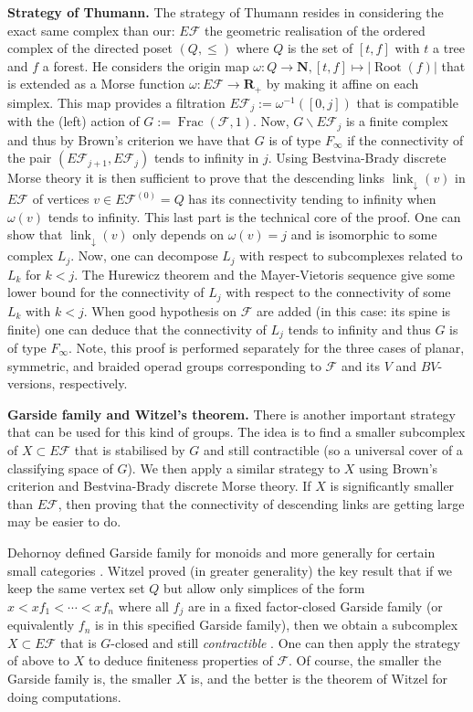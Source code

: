 \documentclass[a4paper, 12pt]{amsart}
\numberwithin{equation}{section}
\theoremstyle{definition}
\newcommand{\bs}{\backslash}
\newcommand{\cF}{\mathcal F}
\DeclareMathOperator{\Frac}{Frac}
\DeclareMathOperator{\link}{link}
\newcommand{\linkd}{\link_{\downarrow}}
\newcommand{\N}{\mathbf{N}}
\newcommand{\R}{\mathbf{R}}
\DeclareMathOperator{\Root}{Root}
\begin{document}
{\bf Strategy of Thumann.}
The strategy of Thumann resides in considering the exact same complex than our: $E\cF$ the geometric realisation of the ordered complex of the directed poset $(Q,\leq)$ where $Q$ is the set of $[t,f]$ with $t$ a tree and $f$ a forest.
He considers the origin map $\omega:Q\to\N, [t,f]\mapsto |\Root(f)|$ that is extended as a Morse function $\omega:E\cF\to\R_+$ by making it affine on each simplex. 
This map provides a filtration $E\cF_j:=\omega^{-1}([0,j])$ that is compatible with the (left) action of $G:=\Frac(\cF,1)$.
Now, $G\bs E\cF_j$ is a finite complex and thus by Brown's criterion we have that $G$ is of type $F_\infty$ if the connectivity of the pair $(E\cF_{j+1},E\cF_j)$ tends to infinity in $j$.
Using Bestvina-Brady discrete Morse theory it is then sufficient to prove that the descending links $\linkd(v)$ in $E\cF$ of vertices $v\in E\cF^{(0)}=Q$ has its connectivity tending to infinity when $\omega(v)$ tends to infinity.
This last part is the technical core of the proof.
One can show that $\linkd(v)$ only depends on $\omega(v)=j$ and is isomorphic to some complex $L_j$. 
Now, one can decompose $L_j$ with respect to subcomplexes related to $L_k$ for $k<j$. 
The Hurewicz theorem and the Mayer-Vietoris sequence give some lower bound for the connectivity of $L_j$ with respect to the connectivity of some $L_k$ with $k<j$.
When good hypothesis on $\cF$ are added (in this case: its spine is finite) one can deduce that the connectivity of $L_j$ tends to infinity and thus $G$ is of type $F_\infty$.
Note, this proof is performed separately for the three cases of planar, symmetric, and braided operad groups corresponding to $\cF$ and its $V$ and $BV$-versions, respectively.

{\bf Garside family and Witzel's theorem.}
There is another important strategy that can be used for this kind of groups.
The idea is to find a smaller subcomplex of $X\subset E\cF$ that is stabilised by $G$ and still contractible (so a universal cover of a classifying space of $G$).
We then apply a similar strategy to $X$ using Brown's criterion and Bestvina-Brady discrete Morse theory.
If $X$ is significantly smaller than $E\cF$, then proving that the connectivity of descending links are getting large may be easier to do.

Dehornoy defined Garside family for monoids and more generally for certain small categories \cite{Dehornoy-book}.
Witzel proved (in greater generality) the key result that if we keep the same vertex set $Q$ but allow only simplices of the form $x<xf_1<\cdots<xf_n$ where all $f_j$ are in a fixed factor-closed Garside family (or equivalently $f_n$ is in this specified Garside family), then we obtain a subcomplex $X\subset E\cF$ that is $G$-closed and still {\it contractible} \cite{Witzel19}.
One can then apply the strategy of above to $X$ to deduce finiteness properties of $\cF$.
Of course, the smaller the Garside family is, the smaller $X$ is, and the better is the theorem of Witzel for doing computations.
\end{document}
